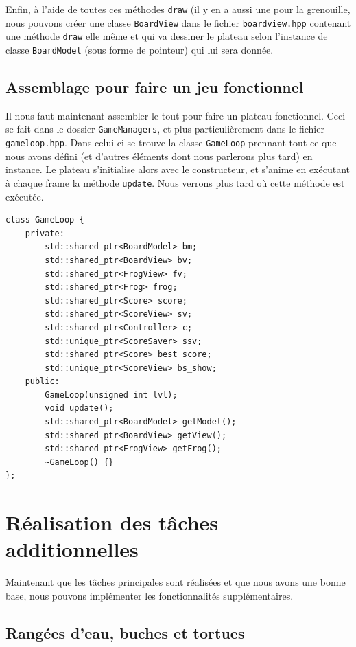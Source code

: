 \documentclass[a4paper, 12pt]{article}
\begin{document}
Enfin, à l'aide de toutes ces méthodes \texttt{draw} (il y en a aussi une pour la grenouille, nous pouvons créer une classe \texttt{BoardView} dans le fichier \texttt{boardview.hpp} contenant une méthode \texttt{draw} elle même et qui va dessiner le plateau selon l'instance de classe \texttt{BoardModel} (sous forme de pointeur) qui lui sera donnée.

\subsection{Assemblage pour faire un jeu fonctionnel}

Il nous faut maintenant assembler le tout pour faire un plateau fonctionnel. Ceci se fait dans le dossier \texttt{GameManagers}, et plus particulièrement dans le fichier \texttt{gameloop.hpp}. Dans celui-ci se trouve la classe \texttt{GameLoop} prennant tout ce que nous avons défini (et d'autres éléments dont nous parlerons plus tard) en instance. Le plateau s'initialise alors avec le constructeur, et s'anime en exécutant à chaque frame la méthode \texttt{update}. Nous verrons plus tard où cette méthode est exécutée. \\

\begin{lstlisting}
class GameLoop {
    private:
        std::shared_ptr<BoardModel> bm;
        std::shared_ptr<BoardView> bv;
        std::shared_ptr<FrogView> fv;
        std::shared_ptr<Frog> frog;
        std::shared_ptr<Score> score;
        std::shared_ptr<ScoreView> sv;
        std::shared_ptr<Controller> c;
        std::unique_ptr<ScoreSaver> ssv;
        std::shared_ptr<Score> best_score;
        std::unique_ptr<ScoreView> bs_show;
    public:
        GameLoop(unsigned int lvl);
        void update();
        std::shared_ptr<BoardModel> getModel();
        std::shared_ptr<BoardView> getView();
        std::shared_ptr<FrogView> getFrog();
        ~GameLoop() {}
};
\end{lstlisting}

\section{Réalisation des tâches additionnelles}
Maintenant que les tâches principales sont réalisées et que nous avons une bonne base, nous pouvons implémenter les fonctionnalités supplémentaires. 

\subsection{Rangées d'eau, buches et tortues} \label{turtle_class}
\end{document}
